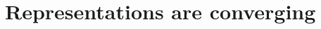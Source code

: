 \documentclass{article}
\theoremstyle{plain}
\theoremstyle{definition}
\theoremstyle{remark}
\begin{document}



\vspace{-3pt}
\section{Representations are converging}\label{sec:reps_are_converging}
\end{document}
